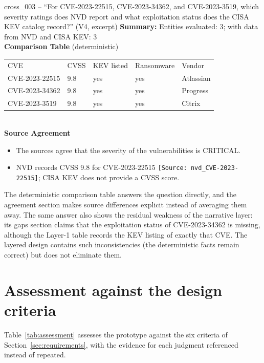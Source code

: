 \begin{responsebox}{cross\_003 -- ``For CVE-2023-22515, CVE-2023-34362,
and CVE-2023-3519, which severity ratings does NVD report and what
exploitation status does the CISA KEV catalog record?'' (V4, excerpt)}
\textbf{Summary:} Entities evaluated: 3; with data from NVD and CISA
KEV: 3\\[4pt]
\textbf{Comparison Table} (deterministic)\\[2pt]
\begin{tabular}{lllll}
    CVE & CVSS & KEV listed & Ransomware & Vendor \\
    CVE-2023-22515 & 9.8 & yes & yes & Atlassian \\
    CVE-2023-34362 & 9.8 & yes & yes & Progress \\
    CVE-2023-3519 & 9.8 & yes & yes & Citrix \\
\end{tabular}\\[4pt]
\textbf{Source Agreement}
\begin{itemize}
    \item The sources agree that the severity of the vulnerabilities is
          CRITICAL.
    \item NVD records CVSS 9.8 for CVE-2023-22515
          \texttt{[Source: nvd\_CVE-2023-22515]}; CISA KEV does not
          provide a CVSS score.
\end{itemize}
\end{responsebox}

The deterministic comparison table answers the question directly, and
the agreement section makes source differences explicit instead of
averaging them away. The same answer also shows the residual weakness of
the narrative layer: its gaps section claims that the exploitation
status of CVE-2023-34362 is missing, although the Layer-1 table records
the KEV listing of exactly that CVE. The layered design contains such
inconsistencies (the deterministic facts remain correct) but does
not eliminate them.

\clearpage %
\section{Assessment against the design criteria}
\label{sec:assessment}

Table~\ref{tab:assessment} assesses the prototype against the six
criteria of Section~\ref{sec:requirements}, with the evidence for each
judgment referenced instead of repeated.


